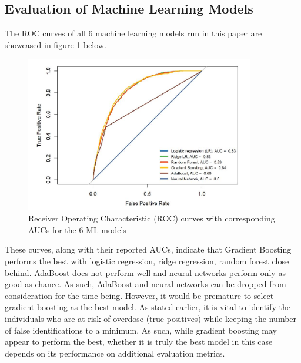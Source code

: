 \documentclass[twoside,10.5pt]{article}
\begin{document}
\subsection{Evaluation of Machine Learning Models}
The ROC curves of all 6 machine learning models run in this paper are showcased in figure \ref{fig:auc_curves} below.  

\begin{figure}[htp]
\centering
\includegraphics[width=10cm]{images/auc_curves.JPG}
\caption{Receiver Operating Characteristic (ROC) curves with corresponding AUCs for the 6 ML models}
\label{fig:auc_curves}
\end{figure}

These curves, along with their reported AUCs, indicate that Gradient Boosting performs the best with logistic regression, ridge regression, random forest close behind. AdaBoost does not perform well and neural networks perform only as good as chance. As such, AdaBoost and neural networks can be dropped from consideration for the time being. However, it would be premature to select gradient boosting as the best model. As stated earlier, it is vital to identify the individuals who are at risk of overdose (true positives) while keeping the number of false identifications to a minimum. As such, while gradient boosting may appear to perform the best, whether it is truly the best model in this case depends on its performance on additional evaluation metrics. \\
\end{document}
